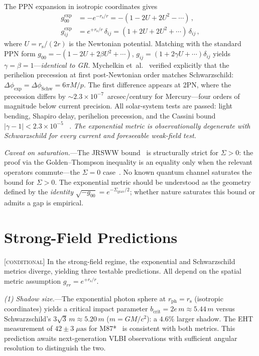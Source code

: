 \documentclass[prl,twocolumn,superscriptaddress,longbibliography,floatfix]{revtex4-2}
\newcommand{\rs}{r_{\mathrm{s}}}
\newcommand{\Sgrav}{\Sigma_{\mathrm{grav}}}
\begin{document}
The PPN expansion in isotropic coordinates gives
\begin{align}
  g_{00}^{\text{exp}} &= -e^{-\rs/r}
  = -(1 - 2U + 2U^2 - \cdots) \,,\\
  g_{ij}^{\text{exp}} &= e^{+\rs/r}\,\delta_{ij}
  = (1 + 2U + 2U^2 + \cdots)\,\delta_{ij}\,,
\end{align}
where $U = \rs/(2r)$ is the Newtonian potential.
Matching with the standard PPN form
$g_{00} = -(1-2U+2\beta U^2+\cdots)$,
$g_{ij} = (1+2\gamma U+\cdots)\delta_{ij}$
yields $\gamma = \beta = 1$---\emph{identical to GR}.
Mychelkin et~al.~\cite{Mychelkin2024} verified explicitly
that the perihelion precession at first post-Newtonian order
matches Schwarzschild:
$\Delta\phi_{\text{exp}} = \Delta\phi_{\text{Schw}}
= 6\pi M/p$.
The first difference appears at 2PN, where the precession
differs by $\sim 2.3\times 10^{-7}$~arcsec/century for
Mercury---four orders of magnitude below current precision.
All solar-system tests are passed: light bending, Shapiro
delay, perihelion precession, and the
Cassini bound $|\gamma - 1| < 2.3\times 10^{-5}$~%
\cite{Bertotti2003}.
\emph{The exponential metric is observationally degenerate
with Schwarzschild for every current and foreseeable
weak-field test.}

\emph{Caveat on saturation.}---The JRSWW
bound~\cite{JRSWW2018} is structurally strict for
$\Sigma > 0$: the proof via the Golden--Thompson inequality
is an equality only when the relevant operators
commute---the $\Sigma = 0$ case~\cite{Petz1988}.
No known quantum channel saturates the bound for
$\Sigma > 0$.
The exponential metric should be understood as the geometry
defined by the \emph{identity}
$\sqrt{-g_{00}} = e^{-\Sgrav/2}$; whether nature saturates
this bound or admits a gap is empirical.

\section{Strong-Field Predictions}
\label{sec:predictions}

[\textsc{conditional}]
In the strong-field regime, the exponential and Schwarzschild
metrics diverge, yielding three testable predictions.
All depend on the spatial metric assumption
$g_{rr} = e^{+\rs/r}$.

\emph{(1) Shadow size.}---The exponential photon sphere
at $r_{\text{ph}} = \rs$ (isotropic coordinates)
yields a critical impact parameter
$b_{\text{crit}} = 2e\,m \approx 5.44\,m$
versus Schwarzschild's $3\sqrt{3}\,m \approx 5.20\,m$
($m = GM/c^2$): a $4.6\%$ larger shadow.
The EHT measurement of $42 \pm 3\;\mu\text{as}$ for
M87*~\cite{EHT2019} is consistent with both metrics.
This prediction awaits next-generation VLBI observations
with sufficient angular resolution to distinguish the two.
\end{document}
